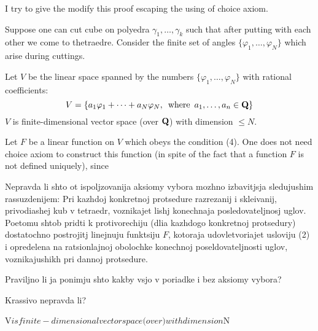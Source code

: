   I try to give the modify this proof escaping the using of choice axiom.

\m


  Suppose one can cut cube on polyedra $\gamma_1,\dots,\gamma_k$
  such that after putting with each other we come to thetraedre.
   Consider the finite set of angles $\{\varphi_1,\dots,\varphi_N\}$
   which arise during cuttings.

   Let $V$ be the linear space spanned by the numbers $\{\varphi_1,\dots,\varphi_N\}$ with rational coefficients:
              $$
      V=\{a_1\varphi_1+\dots+a_N\varphi_N,\,\,\,{\rm where}\,\,\, a_1,\dots,a_n\in {\bf Q}\}
              $$
 $V$ is finite-dimensional vector space (over ${\bf Q}$) with dimension $\leq N$.

 Let $F$ be a linear function on $V$ which obeys the condition (4). One does not need choice axiom to
 construct this function (in spite of the fact that a function $F$ is not defined uniquely),
 since


 Nepravda li shto ot ispoljzovanija aksiomy vybora mozhno izbavitjsja
sledujushim rassuzdenijem:
   Pri kazhdoj  konkretnoj protsedure  razrezanij i skleivanij,
privodiashej kub v tetraedr, voznikajet lishj konechnaja posledovateljnosj
uglov. Poetomu shtob pridti k protivorechiju (dlia kazhdogo konkretnoj
protsedury) dostatochno postrojitj linejnuju funktsiju $F$, kotoraja
udovletvoriajet usloviju (2) i opredelena na ratsionlajnoj obolochke
konechnoj poseldovateljnosti uglov,
    voznikajushikh pri dannoj protsedure.

 Praviljno li ja ponimju shto kakby vsjo v poriadke i bez aksiomy vybora?

   Krassivo nepravda li?







    \bye




V$ is finite-dimensional vector space (over $\Q$) with dimension $\leq N

